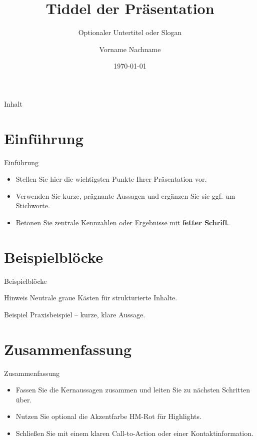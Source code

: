 \documentclass[aspectratio=169,10pt]{beamer}
\title{Tiddel der Präsentation}
\subtitle{Optionaler Untertitel oder Slogan}
\author{Vorname Nachname}
\institute{Organisation oder Unternehmen \\ Abteilung oder Fakultät}
\date{\today}
\begin{document}
\begin{frame}[plain]
  \titlepage
\end{frame}

\begin{frame}{Inhalt}
  \tableofcontents
\end{frame}

\section{Einführung}
\begin{frame}{Einführung}
\begin{itemize}
  \item Stellen Sie hier die wichtigsten Punkte Ihrer Präsentation vor.
  \item Verwenden Sie kurze, prägnante Aussagen und ergänzen Sie sie ggf. um Stichworte.
  \item Betonen Sie zentrale Kennzahlen oder Ergebnisse mit \textbf{fetter Schrift}.
\end{itemize}
\end{frame}

\section{Beispielblöcke}
\begin{frame}{Beispielblöcke}
\begin{block}{Hinweis}
  Neutrale graue Kästen für strukturierte Inhalte.
\end{block}
\begin{exampleblock}{Beispiel}
  Praxisbeispiel – kurze, klare Aussage.
\end{exampleblock}
\end{frame}

\section{Zusammenfassung}
\begin{frame}{Zusammenfassung}
\begin{itemize}
  \item Fassen Sie die Kernaussagen zusammen und leiten Sie zu nächsten Schritten über.
  \item Nutzen Sie optional die Akzentfarbe \textcolor{HMRed}{HM-Rot} für Highlights.
  \item Schließen Sie mit einem klaren Call-to-Action oder einer Kontaktinformation.
\end{itemize}
\end{frame}
\end{document}
